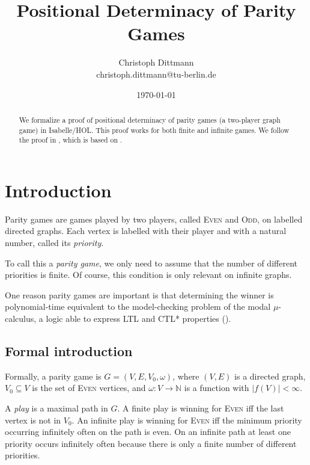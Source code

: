 \documentclass[11pt,a4paper]{scrartcl}
\newcommand{\Even}{\textsc{Even}\xspace}
\newcommand{\Odd}{\textsc{Odd}\xspace}
\begin{document}
\title{Positional Determinacy of Parity Games}
\author{Christoph Dittmann\\christoph.dittmann@tu-berlin.de}
\date{\today}
\maketitle

\begin{abstract}
  We formalize a proof of positional determinacy of parity games (a
  two-player graph game) in Isabelle/HOL.  This proof works for both
  finite and infinite games.  We follow the proof in
  \cite{kreutzer2015}, which is based on \cite{zielonka1998}.
\end{abstract}

\tableofcontents
\newpage

\section{Introduction}

Parity games are games played by two players, called \Even and \Odd,
on labelled directed graphs.  Each vertex is labelled with their
player and with a natural number, called its \emph{priority}.

To call this a \emph{parity game}, we only need to assume that the
number of different priorities is finite.  Of course, this condition
is only relevant on infinite graphs.

One reason parity games are important is that determining the winner
is polynomial-time equivalent to the model-checking problem of the
modal $\mu$-calculus, a logic able to express LTL and CTL* properties
(\cite{bradfield2007}).

\subsection{Formal introduction}

Formally, a parity game is $G = (V,E,V_0,\omega)$, where $(V,E)$ is a
directed graph, $V_0 \subseteq V$ is the set of \Even vertices, and
$\omega: V \to \mathbb{N}$ is a function with $|f(V)| < \infty$.

A \emph{play} is a maximal path in $G$.  A finite play is winning for
\Even iff the last vertex is not in $V_0$.  An infinite play is
winning for \Even iff the minimum priority occurring infinitely often
on the path is even.  On an infinite path at least one priority occurs
infinitely often because there is only a finite number of different
priorities.
\end{document}
